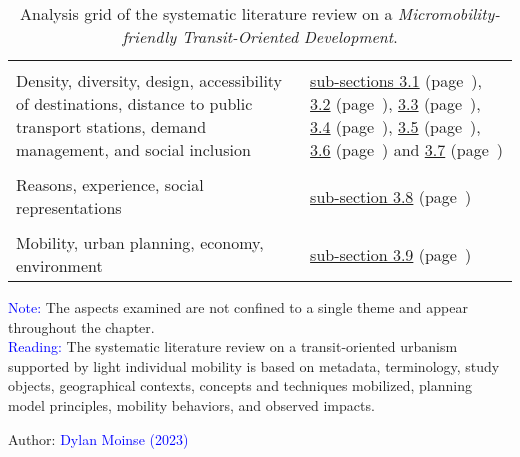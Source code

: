 \begin{table}[h!]
{\begin{tabular}{p{}p{}}
    \hdashline
    \multicolumn{2}{l}{\small{\textbf{\textcolor{blue}{TOD Principles (\Commas{\acrshort{7Ds}})}}}}\\
\small{Density, diversity, design, accessibility of destinations, distance to public transport stations, demand management, and social inclusion} & \small{\hyperref[chap2:densite-population]{sub-sections 3.1} (page~\pageref{chap2:densite-population}), \hyperref[chap2:diversite-fonctionnelle]{3.2} (page~\pageref{chap2:diversite-fonctionnelle}), \hyperref[chap2:traitement-espaces-publics]{3.3} (page~\pageref{chap2:traitement-espaces-publics}), \hyperref[chap2:accessibilite-intermodale]{3.4} (page~\pageref{chap2:accessibilite-intermodale}), \hyperref[chap2:distances-premiers-derniers-km]{3.5} (page~\pageref{chap2:distances-premiers-derniers-km}), \hyperref[chap2:gestion-demande-mobilite]{3.6} (page~\pageref{chap2:gestion-demande-mobilite}) and \hyperref[chap2:sociodemographie-usagers]{3.7} (page~\pageref{chap2:sociodemographie-usagers})}\\
    \hdashline
    \multicolumn{2}{l}{\small{\textbf{\textcolor{blue}{Mobility Behaviors}}}}\\
\small{Reasons, experience, social representations} & \small{\hyperref[chap2:comportements-mobilite]{sub-section 3.8} (page~\pageref{chap2:comportements-mobilite})}\\
    \hdashline
    \multicolumn{2}{l}{\small{\textbf{\textcolor{blue}{Impacts}}}}\\
\small{Mobility, urban planning, economy, environment} & \small{\hyperref[chap2:impacts-systemes-urbain-mobilite]{sub-section 3.9} (page~\pageref{chap2:impacts-systemes-urbain-mobilite})}\\
        \hline
        \end{tabular}}
    \caption{Analysis grid of the systematic literature review on a \textsl{Micromobility-friendly Transit-Oriented Development}.}
    \label{table-chap2:aspects-etudies-rsl}
        \vspace{5pt}
        \begin{flushleft}\scriptsize{
        \textcolor{blue}{Note:} The aspects examined are not confined to a single theme and appear throughout the chapter.
        \\
        \textcolor{blue}{Reading:} The systematic literature review on a transit-oriented urbanism supported by light individual mobility is based on metadata, terminology, study objects, geographical contexts, concepts and techniques mobilized, planning model principles, mobility behaviors, and observed impacts.
        }\end{flushleft}
        \begin{flushright}\scriptsize{
        Author: \textcolor{blue}{Dylan Moinse (2023)}
        }\end{flushright}
        \end{table}